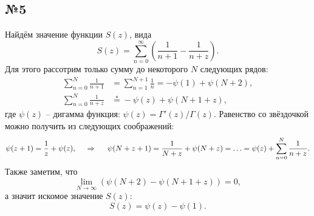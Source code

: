 \subsection*{№5}
Найдём значение функции $S(z)$, вида
\begin{equation*}
    S(z) = \sum_{n=0}^{\infty} \left(\frac{1}{n+1}-\frac{1}{n+z}\right).
\end{equation*}
Для этого рассотрим только сумму до некоторого $N$ следующих рядов:
\begin{align*}
    \sum_{n=0}^{N} \frac{1}{n+1} &= \sum_{n=1}^{N+1} \frac{1}{n} = - \psi(1) + \psi(N+2), \\
    \sum_{n=0}^{N} \frac{1}{n+z} &\overset{*}{=}  - \psi(z) + \psi(N+1+z),
\end{align*}
где $\psi(z)$ -- дигамма функция: $\psi(z) = \Gamma'(z)/\Gamma(z)$. Равенство со звёздочкой можно получить из следующих соображений:
\begin{equation*}
    \psi(z+1) = \frac{1}{z} + \psi(z),
    \hspace{0.5cm} \Rightarrow \hspace{0.5cm}
    \psi(N + z + 1) = \frac{1}{N+z} + \psi(N+z) = \ldots = \psi(z) + \sum_{n=0}^{N} \frac{1}{n+z}.
\end{equation*}
Также заметим, что
\begin{equation*}
    \lim_{N \to \infty} \left(
        \psi(N+2) - \psi\left(N+1 +z\right)
    \right) = 0,
\end{equation*}
а значит искомое значение $S(z)$:
\begin{equation*}
    S(z) = \psi(z) - \psi(1).
\end{equation*}






